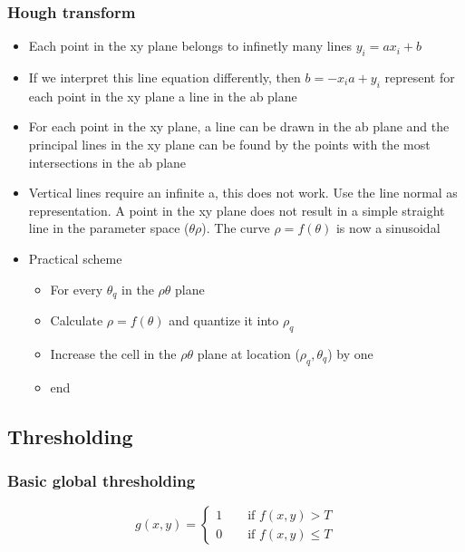 \subsubsection{Hough transform}
\begin{itemize}
\item Each point in the xy plane belongs to infinetly many lines $y_i=ax_i+b$
\item If we interpret this line equation differently, then $b=-x_ia+y_i$ represent for each point in the xy plane a line in the ab plane
\item For each point in the xy plane, a line can be drawn in the ab plane and the principal lines in the xy plane can be found by the points with the most intersections in the ab plane
\item Vertical lines require an infinite a, this does not work. Use the line normal as representation. A point in the xy plane does not result in a simple straight line in the parameter space ($\theta\rho$). The curve $\rho = f(\theta)$ is now a sinusoidal
\item Practical scheme
\begin{itemize}
\item For every $\theta_q$ in the $\rho\theta$ plane
\item Calculate $\rho = f(\theta)$ and quantize it into $\rho_q$
\item Increase the cell in the $\rho\theta$ plane at location ($\rho_q, \theta_q$) by one
\item end
\end{itemize}
\end{itemize}

\subsection{Thresholding}
\subsubsection{Basic global thresholding}
\begin{equation}
g(x,y)=\begin{cases}1 \qquad \text{if } f(x,y) > T \\0 \qquad  \text{if } f(x,y) \leq T \end{cases} \label{thresholdingBasic}
\end{equation}

